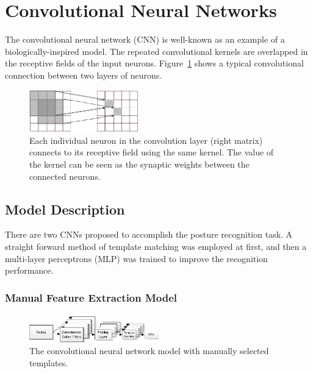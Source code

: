 \documentclass[journal]{journal}
\begin{document}
\section{Convolutional Neural Networks}
\label{sec:cnn}
The convolutional neural network (CNN) is well-known as an example of a biologically-inspired model. 
The repeated convolutional kernels are overlapped in the receptive fields of the input neurons. 
Figure~\ref{fig:conv} shows a typical convolutional connection between two layers of neurons. 

\begin{figure}
\centering
	\includegraphics[width=0.42\textwidth]{pics/conv.pdf}
	\caption{Each individual neuron in the convolution layer (right matrix) connects to its receptive field using the same kernel. The value of the kernel can be seen as the synaptic weights between the connected neurons.}
	\label{fig:conv}
\end{figure}

\subsection{Model Description}
\label{sec:mds}
There are two CNNs proposed to accomplish the posture recognition task.
A straight forward method of template matching was employed at first, and then a multi-layer perceptrons (MLP) was trained to improve the recognition performance.
\subsubsection{Manual Feature Extraction Model}

\begin{figure}
\centering
	\includegraphics[width=0.50\textwidth]{pics/model1.pdf}
	\caption{The convolutional neural network model with manually selected templates.}
	\label{fig:model1}
\end{figure}
\end{document}

